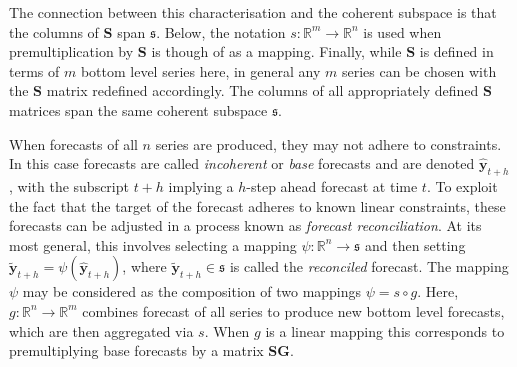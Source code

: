 \documentclass[12pt]{article}
\theoremstyle{definition}
\begin{document}
The connection between this characterisation and the coherent subspace is that the columns of $\bm{S}$ span $\mathfrak{s}$.  Below, the notation $s:\mathbb{R}^m\rightarrow\mathbb{R}^n$ is used when premultiplication by $\bm{S}$ is though of as a mapping.  Finally, while $\bm{S}$ is defined in terms of $m$ bottom level series here, in general any $m$ series can be chosen with the $\bm{S}$ matrix redefined accordingly.  The columns of all appropriately defined $\bm{S}$ matrices span the same coherent subspace $\mathfrak{s}$.



When forecasts of all $n$ series are produced, they may not adhere to constraints. 
In this case forecasts are called {\em incoherent} or {\em base} forecasts and are denoted $\hat{\bm y}_{t+h}$, with the subscript $t+h$ implying a $h$-step ahead forecast at time $t$.  To exploit the fact that the target of the forecast adheres to known linear constraints, these forecasts can be adjusted in a process known as {\em forecast reconciliation}.  At its most general, this involves selecting a mapping $\psi:\mathbb{R}^n\rightarrow\mathfrak{s}$ and then setting $\tilde{\bm y}_{t+h}=\psi(\hat{\bm y}_{t+h})$, where $\tilde{\bm y}_{t+h}\in\mathfrak{s}$ is called the {\em reconciled} forecast.  The mapping $\psi$ may be considered as the composition of two mappings $\psi=s\circ g$. Here, $g:\mathbb{R}^{n}\rightarrow\mathbb{R}^{m}$ combines forecast of all series to produce new bottom level forecasts, which are then aggregated via $s$.  When $g$ is a linear mapping this corresponds to premultiplying base forecasts by a matrix $\bm{S}\bm{G}$.  
\end{document}
